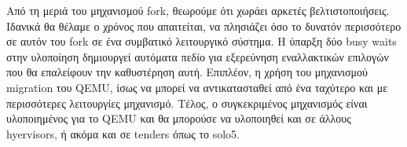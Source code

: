 Από τη μεριά του μηχανισμού fork, θεωρούμε ότι χωράει αρκετές βελτιστοποιήσεις.
Ιδανικά θα θέλαμε ο χρόνος που απαιτείται, να πλησιάζει όσο το δυνατόν
περισσότερο σε αυτόν του fork σε ένα συμβατικό λειτουργικό σύστημα. Η ύπαρξη δύο
busy waits στην υλοποίηση δημιουργεί αυτόματα πεδίο για εξερεύνηση εναλλακτικών
επιλογών που θα επαλείφουν την καθυστέρηση αυτή. Επιπλέον, η χρήση του
μηχανισμού migration του QEMU, ίσως να μπορεί να αντικατασταθεί από ένα ταχύτερο
και με περισσότερες λειτουργίες μηχανισμό. Τέλος, ο συγκεκριμένος μηχανισμός
είναι υλοποιημένος για το QEMU και θα μπορούσε να υλοποιηθεί και σε άλλους
hyervisors, ή ακόμα και σε tenders όπως το solo5.


